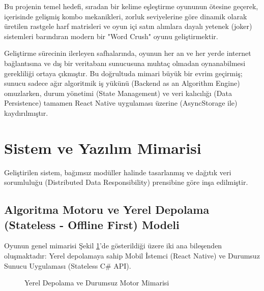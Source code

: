 \documentclass[conference,a4paper]{IEEEtran}
\begin{document}
Bu projenin temel hedefi, sıradan bir kelime eşleştirme oyununun ötesine geçerek, içerisinde gelişmiş kombo mekanikleri, zorluk seviyelerine göre dinamik olarak üretilen rastgele harf matrisleri ve oyun içi satın alımlara dayalı yetenek (joker) sistemleri barındıran modern bir "Word Crush" oyunu geliştirmektir.

Geliştirme sürecinin ilerleyen safhalarında, oyunun her an ve her yerde internet bağlantısına ve dış bir veritabanı sunucusuna muhtaç olmadan oynanabilmesi gerekliliği ortaya çıkmıştır. Bu doğrultuda mimari büyük bir evrim geçirmiş; sunucu sadece ağır algoritmik iş yükünü (Backend as an Algorithm Engine) omuzlarken, durum yönetimi (State Management) ve veri kalıcılığı (Data Persistence) tamamen React Native uygulaması üzerine (AsyncStorage ile) kaydırılmıştır.

\section{Sistem ve Yazılım Mimarisi}
Geliştirilen sistem, bağımsız modüller halinde tasarlanmış ve dağıtık veri sorumluluğu (Distributed Data Responsibility) prensibine göre inşa edilmiştir.

\subsection{Algoritma Motoru ve Yerel Depolama (Stateless - Offline First) Modeli}
Oyunun genel mimarisi Şekil \ref{fig:mimari}'de gösterildiği üzere iki ana bileşenden oluşmaktadır: Yerel depolamaya sahip Mobil İstemci (React Native) ve Durumsuz Sunucu Uygulaması (Stateless C\# API).

\begin{figure}[H]
\centering
{}
\caption{Yerel Depolama ve Durumsuz Motor Mimarisi}
\label{fig:mimari}
\end{figure}
\end{document}
